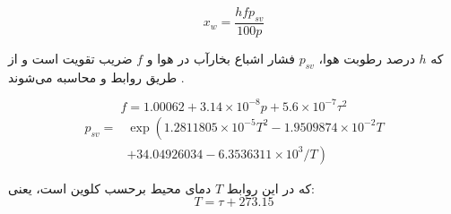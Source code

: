 \begin{equation}\label{eq:x_w}
x_w=\frac{h f p_{sv}}{100 p}
\end{equation}

که $h$ درصد رطوبت هوا، $p_{sv}$ فشار اشباع بخارآب در هوا و $f$ ضریب تقویت است و از طریق روابط  و  محاسبه می‌شوند .

\begin{equation}\label{eq:f}
f=1.00062+3.14 \times 10^{-8} p+5.6 \times 10^{-7} \tau^{2}
\end{equation}
\begin{equation}\label{eq:p_sv}
\begin{aligned}
p_{s v}=& \exp \left(1.2811805 \times 10^{-5} T^{2}-1.9509874 \times 10^{-2} T\right.\\
&\left.+34.04926034-6.3536311 \times 10^{3} / T\right)
\end{aligned}
\end{equation}

که در این روابط $T$ دمای محیط برحسب کلوین است، یعنی:
\begin{equation}
T = \tau + 273.15
\end{equation}

